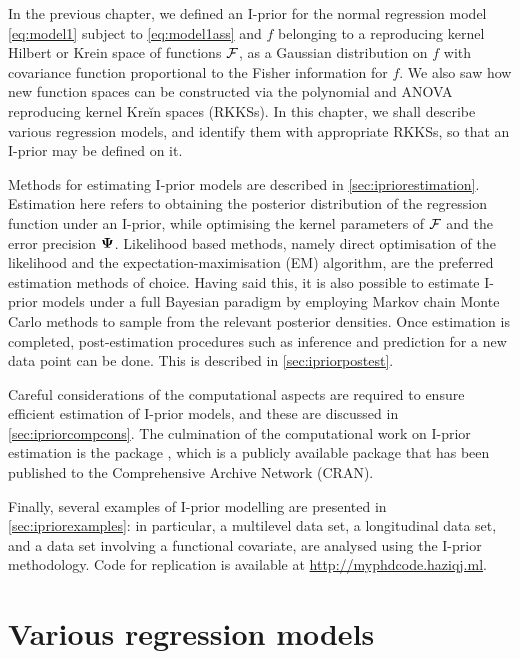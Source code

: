 \documentclass[showframe,11pt,twoside,openright]{report}
\begin{document}
\label{chapter4}
\thispagestyle{chapterfour}

In the previous chapter, we defined an I-prior for the normal regression model \cref{eq:model1} subject to \cref{eq:model1ass} and $f$ belonging to a reproducing kernel Hilbert or Krein space of functions ${\mathcal F}$, as a Gaussian distribution on $f$ with covariance function proportional to the Fisher information for $f$.
We also saw how new function spaces can be constructed via the polynomial and ANOVA reproducing kernel Kreĭn spaces (RKKSs).
In this chapter, we shall describe various regression models, and identify them with appropriate RKKSs, so that an I-prior may be defined on it.

Methods for estimating I-prior models are described in \cref{sec:ipriorestimation}.
Estimation here refers to obtaining the posterior distribution of the regression function under an I-prior, while optimising the kernel parameters of ${\mathcal F}$ and the error precision ${\bm\Psi}$.
Likelihood based methods, namely direct optimisation of the likelihood and the expectation-maximisation (EM) algorithm, are the preferred estimation methods of choice.
Having said this, it is also possible to estimate I-prior models under a full Bayesian paradigm by employing Markov chain Monte Carlo methods to sample from the relevant posterior densities.
Once estimation is completed, post-estimation procedures such as inference and prediction for a new data point can be done.
This is described in \cref{sec:ipriorpostest}.

Careful considerations of the computational aspects are required to ensure efficient estimation of I-prior models, and these are discussed in \cref{sec:ipriorcompcons}.
The culmination of the computational work on I-prior estimation is the  package \citep{jamil2017iprior}, which is a publicly available  package that has been published to the Comprehensive  Archive Network (CRAN).

Finally, several examples of I-prior modelling are presented in  \cref{sec:ipriorexamples}: in particular, a multilevel data set, a longitudinal data set, and a data set involving a functional covariate, are analysed using the I-prior methodology.
Code for replication is available at \url{http://myphdcode.haziqj.ml}.

\section{Various regression models}
\label{sec:various-regression}

\end{document}
